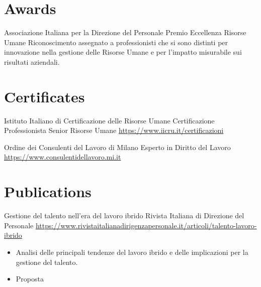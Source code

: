 \documentclass[a4paper, serif, 10pt]{moderncv}
\begin{document}
\section{Awards}

        {Associazione Italiana per la Direzione del Personale}
        {Premio Eccellenza Risorse Umane}
        {}
        {}
        {Riconoscimento assegnato a professionisti che si sono distinti per innovazione nella gestione delle Risorse Umane e per l'impatto misurabile sui risultati aziendali.}
\section{Certificates}

        {Istituto Italiano di Certificazione delle Risorse Umane}
        {Certificazione Professionista Senior Risorse Umane}
        {\url{https://www.iicru.it/certificazioni}}
        {}
        {}

        {Ordine dei Consulenti del Lavoro di Milano}
        {Esperto in Diritto del Lavoro}
        {\url{https://www.consulentidellavoro.mi.it}}
        {}
        {}
\section{Publications}

        {Gestione del talento nell'era del lavoro ibrido}
        {Rivista Italiana di Direzione del Personale}
        {\url{https://www.rivistaitalianadirigenzapersonale.it/articoli/talento-lavoro-ibrido}}
        {}
        {\begin{itemize}
\item Analisi delle principali tendenze del lavoro ibrido e delle implicazioni per la gestione del talento.
\item Proposta
\end{itemize}}
\end{document}
